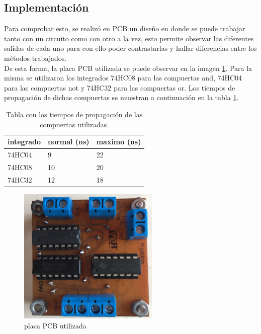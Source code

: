 \subsection{Implementaci\'on}
%
\noindent
Para comprobar esto, se realiz\'o en PCB un diseño en donde se puede trabajar tanto con un circuito como con otro a la vez, esto permite observar las diferentes salidas de cada uno para con ello poder contrastarlas y hallar diferencias entre los métodos trabajados.\\
\noindent
De esta forma, la placa PCB utilizada se puede observar en la imagen \ref{ej3_placa}.
Para la misma se utilizaron los integrados 74HC08 para las compuertas and, 74HC04 para las compuertas not y 74HC32 para las compuertas or. Los tiempos de propagación de dichas compuertas se muestran a continuación en la tabla \ref{tabla_comp_tiempos_prop}.
%
\begin{table}[H]
\caption{Tabla con los tiempos de propagación de las compuertas utilizadas.}
\label{tabla_comp_tiempos_prop}
\centering
\begin{tabular}{|l||l|l|}
\hline
integrado & normal (ns) & maximo (ns) \\ \hline \hline
74HC04    & 9      & 22     \\ \hline
74HC08    & 10     & 20     \\ \hline
74HC32    & 12     & 18     \\ \hline
\end{tabular}
\end{table}
%
%
%
\begin{figure}[H]
    \centering
        \centering
        \includegraphics[width=0.6\textwidth]{figs/Ej3/Circuito_PCB.jpg} %
         \caption{placa PCB utilizada}
         \label{ej3_placa}
\end{figure}
%
